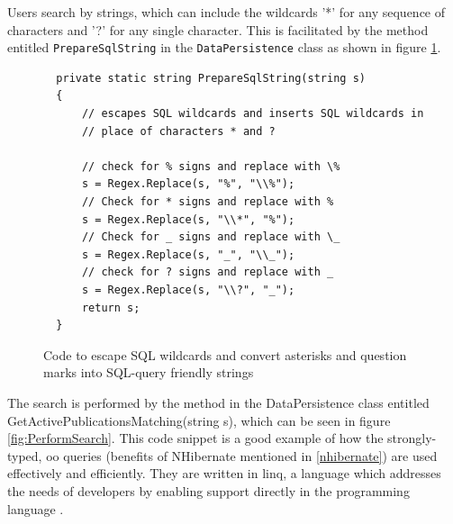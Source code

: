 Users search by strings, which can include the wildcards '*' for any sequence of characters and '?' for any single character.
This is facilitated by the method entitled \texttt{PrepareSqlString} in the \texttt{DataPersistence} class as shown in figure \ref{fig:SQLsearchEscape}.

\begin{figure}
	\begin{center}
			\lstset{language=CSharp} 
			\begin{lstlisting}
  private static string PrepareSqlString(string s)
  {
      // escapes SQL wildcards and inserts SQL wildcards in
      // place of characters * and ?
      
      // check for % signs and replace with \%
      s = Regex.Replace(s, "%", "\\%");
      // Check for * signs and replace with %
      s = Regex.Replace(s, "\\*", "%");
      // Check for _ signs and replace with \_
      s = Regex.Replace(s, "_", "\\_");
      // check for ? signs and replace with _
      s = Regex.Replace(s, "\\?", "_");
      return s;
  }
  		\end{lstlisting}
		\caption{Code to escape SQL wildcards and convert asterisks and question marks into SQL-query friendly strings}
		\label{fig:SQLsearchEscape}
	\end{center}
\end{figure}

The search is performed by the method in the DataPersistence class entitled GetActivePublicationsMatching(string s), which can be seen in figure \ref{fig:PerformSearch}.  This code snippet is a good example of how the strongly-typed, \gls{oo} queries (benefits of NHibernate mentioned in \ref{nhibernate}) are used effectively and efficiently.  They are written in \gls{linq}, a language which addresses the needs of developers by enabling support directly in the programming language \cite{csUnleashed}.

